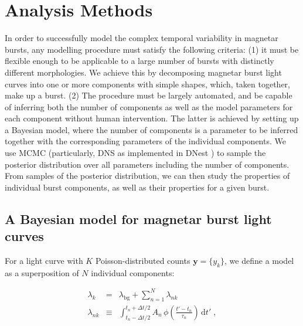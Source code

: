 \documentclass[12pt]{emulateapj}
\newcommand{\given}{\,|\,}
\newcommand{\dd}{\mathrm{d}}
\newcommand{\counts}{y}
\newcommand{\pars}{\theta}
\newcommand{\mean}{\lambda}
\newcommand{\Poisson}{{\mathcal P}}
\newcommand{\bg}{\mathrm{bg}}
\newcommand{\word}{\phi}
\begin{document}
\section{Analysis Methods}
\label{sec:methods}
In order to successfully model the complex temporal variability in magnetar bursts, any modelling procedure must satisfy the following criteria: (1) it must be flexible enough to be applicable to a large number of bursts with distinctly different morphologies. We achieve this by decomposing magnetar burst light curves into one or more components with simple shapes, which, taken together, make up a burst. (2) The procedure must be largely automated, and be capable of inferring both the number of components as well as the model parameters for each component without human intervention. The latter is achieved by setting up a Bayesian model, where the number of components is a parameter to be inferred together with the corresponding parameters of the individual components. We use MCMC (particularly, DNS as implemented in DNest \citep{brewer2011}) to sample the posterior distribution over all parameters including the number of components. From samples of the posterior distribution,
we can then study the properties of individual burst components, as well as their properties for a given burst.

\subsection{A Bayesian model for magnetar burst light curves}
\label{sec:model}

For a light curve with $K$ Poisson-distributed counts $\bm{\counts} = \{\counts_k\}$, we define a model as a superposition of $N$ individual components:

\begin{eqnarray}
\mean_k &=& \mean_{\bg} + \sum_{n=1}^N \mean_{nk}
\\
\mean_{nk} &\equiv& \int_{t_n-\Delta t/2}^{t_n+\Delta t/2} A_n\,\word\left(\frac{t'-t_n}{\tau_n}\right)\,\dd t' \; ,
\end{eqnarray}
\end{document}
